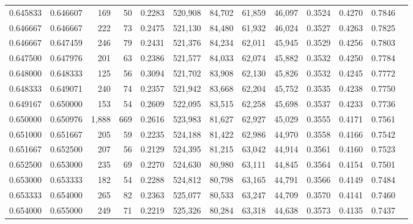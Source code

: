 \begin{tabular}{rrrrrrrrrrrrr}
0.645833 & 0.646607 &   169 &  50 &                                     0.2283 & 520,908 &  84,702 &  61,859 &  46,097 & 0.3524 & 0.4270 & 0.7846 \\
0.646667 & 0.646667 &   222 &  73 &                                     0.2475 & 521,130 &  84,480 &  61,932 &  46,024 & 0.3527 & 0.4263 & 0.7825 \\
0.646667 & 0.647459 &   246 &  79 &                                     0.2431 & 521,376 &  84,234 &  62,011 &  45,945 & 0.3529 & 0.4256 & 0.7803 \\
0.647500 & 0.647976 &   201 &  63 &                                     0.2386 & 521,577 &  84,033 &  62,074 &  45,882 & 0.3532 & 0.4250 & 0.7784 \\
0.648000 & 0.648333 &   125 &  56 &                                     0.3094 & 521,702 &  83,908 &  62,130 &  45,826 & 0.3532 & 0.4245 & 0.7772 \\
0.648333 & 0.649071 &   240 &  74 &                                     0.2357 & 521,942 &  83,668 &  62,204 &  45,752 & 0.3535 & 0.4238 & 0.7750 \\
0.649167 & 0.650000 &   153 &  54 &                                     0.2609 & 522,095 &  83,515 &  62,258 &  45,698 & 0.3537 & 0.4233 & 0.7736 \\
0.650000 & 0.650976 & 1,888 & 669 &                                     0.2616 & 523,983 &  81,627 &  62,927 &  45,029 & 0.3555 & 0.4171 & 0.7561 \\
0.651000 & 0.651667 &   205 &  59 &                                     0.2235 & 524,188 &  81,422 &  62,986 &  44,970 & 0.3558 & 0.4166 & 0.7542 \\
0.651667 & 0.652500 &   207 &  56 &                                     0.2129 & 524,395 &  81,215 &  63,042 &  44,914 & 0.3561 & 0.4160 & 0.7523 \\
0.652500 & 0.653000 &   235 &  69 &                                     0.2270 & 524,630 &  80,980 &  63,111 &  44,845 & 0.3564 & 0.4154 & 0.7501 \\
0.653000 & 0.653333 &   182 &  54 &                                     0.2288 & 524,812 &  80,798 &  63,165 &  44,791 & 0.3566 & 0.4149 & 0.7484 \\
0.653333 & 0.654000 &   265 &  82 &                                     0.2363 & 525,077 &  80,533 &  63,247 &  44,709 & 0.3570 & 0.4141 & 0.7460 \\
0.654000 & 0.655000 &   249 &  71 &                                     0.2219 & 525,326 &  80,284 &  63,318 &  44,638 & 0.3573 & 0.4135 & 0.7437 \\

\end{tabular}
